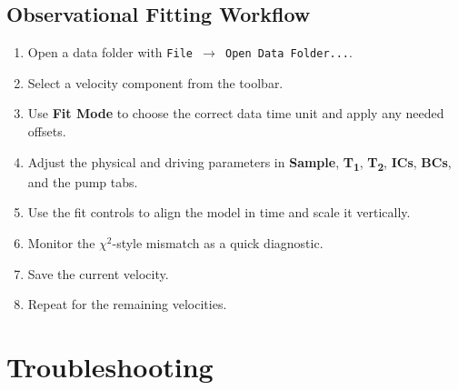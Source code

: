 \documentclass[12pt,a4paper]{article}
\newcommand{\tab}[1]{\textbf{#1}}
\newcommand{\menu}[1]{\texttt{#1}}
\begin{document}
\subsection{Observational Fitting Workflow}

\begin{enumerate}
  \item Open a data folder with \menu{File $\to$ Open Data Folder...}.
  \item Select a velocity component from the toolbar.
  \item Use \tab{Fit Mode} to choose the correct data time unit and apply any needed offsets.
    \item Adjust the physical and driving parameters in \tab{Sample},
        \tab{T\textsubscript{1}}, \tab{T\textsubscript{2}}, \tab{ICs},
        \tab{BCs}, and the pump tabs.
  \item Use the fit controls to align the model in time and scale it vertically.
  \item Monitor the $\chi^2$-style mismatch as a quick diagnostic.
  \item Save the current velocity.
  \item Repeat for the remaining velocities.
\end{enumerate}

\section{Troubleshooting}
\end{document}

